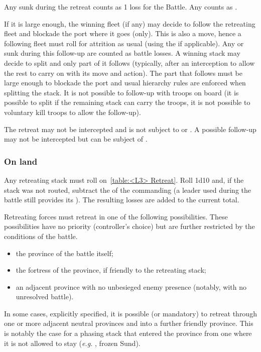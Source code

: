 Any \ND sunk during the retreat counts as 1 loss for the Battle. Any \NDE
counts as \texttu.

If it is large enough, the winning fleet (if any) may decide to follow the
retreating fleet and blockade the port where it goes (only). This is also a
move, hence a following fleet must roll for attrition as usual (using the
 \LeaderA if applicable). Any \ND or \NDE sunk during this
follow-up are counted as battle losses. A winning stack may decide to split
and only part of it follows (typically, after an interception to allow the
rest to carry on with its move and action). The part that follows must be
large enough to blockade the port and usual hierarchy rules are enforced when
splitting the stack. It is not possible to follow-up with troops on board (it
is possible to split if the remaining stack can carry the troops, it is not
possible to voluntary kill troops to allow the follow-up).

The retreat may not be intercepted and is not subject to \Presidios or
\StraitFort. A possible follow-up may not be intercepted but can be subject of
\StraitFort.

\subsubsection{On land}

Any retreating stack must roll on~\ref{table:<L3> Retreat}. Roll 1d10 and, if
the stack was not routed, subtract the \Man of the commanding \LeaderG (a
 leader used during the battle still provides its
\Man). The resulting losses are added to the current total.

Retreating forces must retreat in one of the following possibilities. These
possibilities have no priority (controller's choice) but are further
restricted by the conditions of the battle.
\begin{itemize}
\item the province of the battle itself;
\item the fortress of the province, if friendly to the retreating stack;
\item an adjacent province with no unbesieged enemy presence (notably, with no
  unresolved battle).
\end{itemize}

In some cases, explicitly specified, it is possible (or mandatory) to retreat
through one or more adjacent neutral provinces and into a further friendly
province. This is notably the case for a phasing stack that entered the
province from one where it is not allowed to stay (\emph{e.g.} \HRE, frozen
Sund).

